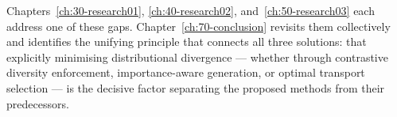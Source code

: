 \begin{foldable}
  Chapters~\ref{ch:30-research01}, \ref{ch:40-research02}, and~\ref{ch:50-research03} each address one of these gaps.
  Chapter~\ref{ch:70-conclusion} revisits them collectively and identifies the unifying principle that connects all three solutions: that explicitly minimising distributional divergence --- whether through contrastive diversity enforcement, importance-aware generation, or optimal transport selection --- is the decisive factor separating the proposed methods from their predecessors.
\end{foldable}

